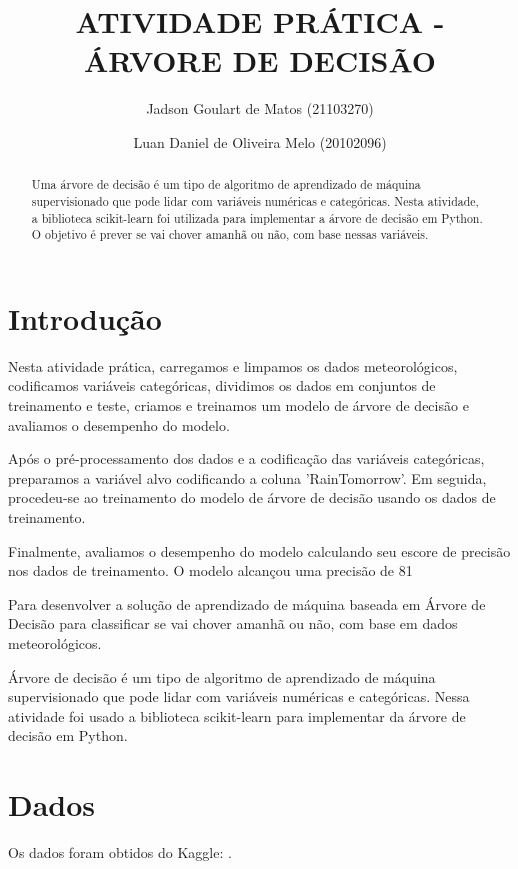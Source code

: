 \documentclass{article}
\title{ATIVIDADE PRÁTICA - ÁRVORE DE DECISÃO}
\author[1]{Jadson Goulart de Matos (21103270)}
\author[2]{Luan Daniel de Oliveira Melo (20102096)}
\affil[1]{DEC0014-06655 (20231) - Inteligência Artificial e Computacional, UFSC}
\begin{document}
\maketitle

\begin{abstract}
Uma árvore de decisão é um tipo de algoritmo de aprendizado de máquina supervisionado que pode lidar com variáveis numéricas e categóricas. Nesta atividade, a biblioteca scikit-learn foi utilizada para implementar a árvore de decisão em Python. O objetivo é prever se vai chover amanhã ou não, com base nessas variáveis.
\end{abstract}

\listoffigures
\listoftables
\newpage

\section{Introdução}
Nesta atividade prática, carregamos e limpamos os dados meteorológicos, codificamos variáveis categóricas, dividimos os dados em conjuntos de treinamento e teste, criamos e treinamos um modelo de árvore de decisão e avaliamos o desempenho do modelo.

Após o pré-processamento dos dados e a codificação das variáveis categóricas, preparamos a variável alvo codificando a coluna 'RainTomorrow'. Em seguida, procedeu-se ao treinamento do modelo de árvore de decisão usando os dados de treinamento.

Finalmente, avaliamos o desempenho do modelo calculando seu escore de precisão nos dados de treinamento. O modelo alcançou uma precisão de 81%

Para desenvolver a solução de aprendizado de máquina baseada em Árvore de Decisão para classificar se vai chover amanhã ou não, com base em dados meteorológicos.

Árvore de decisão é um tipo de algoritmo de aprendizado de máquina supervisionado que pode lidar com variáveis numéricas e categóricas. Nessa atividade foi usado a biblioteca \cite{scikit-learn} scikit-learn para implementar da árvore de decisão em Python.

\section{Dados}
Os dados foram obtidos do Kaggle: \cite{Deekshitulu_2023}.
\end{document}
